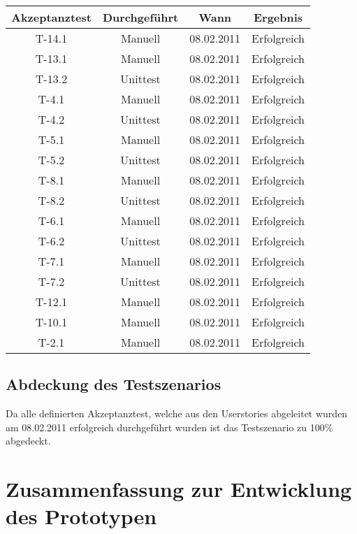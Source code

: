 \documentclass[listof=totocnumbered, bibliography=totocnumbered]{scrreprt}
\begin{document}
  \begin{tabular}{cccc}
    \toprule
    Akzeptanztest & Durchgeführt & Wann & Ergebnis \\
    \midrule
    T-14.1 & Manuell & 08.02.2011 & Erfolgreich \\
    T-13.1 & Manuell & 08.02.2011 & Erfolgreich \\
    T-13.2 & Unittest & 08.02.2011 & Erfolgreich \\
    T-4.1 & Manuell & 08.02.2011 & Erfolgreich \\
    T-4.2 & Unittest & 08.02.2011 & Erfolgreich \\
    T-5.1 & Manuell & 08.02.2011 & Erfolgreich \\
    T-5.2 & Unittest & 08.02.2011 & Erfolgreich \\
    T-8.1 & Manuell & 08.02.2011 & Erfolgreich \\
    T-8.2 & Unittest & 08.02.2011 & Erfolgreich \\
    T-6.1 & Manuell & 08.02.2011 & Erfolgreich \\
    T-6.2 & Unittest & 08.02.2011 & Erfolgreich \\
    T-7.1 & Manuell & 08.02.2011 & Erfolgreich \\
    T-7.2 & Unittest & 08.02.2011 & Erfolgreich \\
    T-12.1 & Manuell & 08.02.2011 & Erfolgreich \\
    T-10.1 & Manuell & 08.02.2011 & Erfolgreich \\
    T-2.1 & Manuell & 08.02.2011 & Erfolgreich \\
    \bottomrule
  \end{tabular}
  
  \subsection{Abdeckung des Testszenarios}
  
  Da alle definierten Akzeptanztest, welche aus den Userstories abgeleitet
  wurden am 08.02.2011 erfolgreich durchgeführt wurden ist das Testszenario zu
  100\% abgedeckt.
  
  \newpage
  
  \section{Zusammenfassung zur Entwicklung des Prototypen}
  
  
\end{document}
